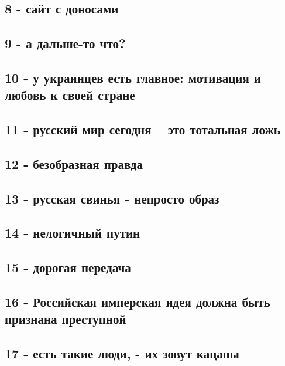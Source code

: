 \subsection{8 - сайт с доносами}

\subsection{9 - а дальше-то что?}

\subsection{10 - у украинцев есть главное: мотивация и любовь к своей стране}

\subsection{11 - русский мир сегодня – это тотальная ложь}

\subsection{12 - безобразная правда}

\subsection{13 - русская свинья - непросто образ}

\subsection{14 - нелогичный путин}

\subsection{15 - дорогая передача}

\subsection{16 - Российская имперская идея должна быть признана преступной}

\subsection{17 - есть такие люди, - их зовут кацапы}


